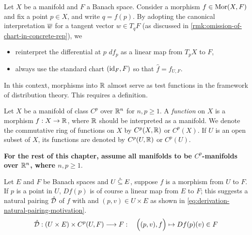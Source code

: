 \documentclass[../main-manifolds.tex]{subfiles}
\begin{document}
Let $X$ be a manifold and $F$ a Banach space. Consider a morphism $f \in \operatorname{Mor}(X,F)$ and fix a point $p \in X$, and write $q = f(p)$. By adopting the canonical interpretation $\overline{w}$ for a tangent vector $w \in T_q F$ (as discussed in \cref{rmk:omission-of-chart-in-concrete-rep}), we 

\begin{itemize}
    \item reinterpret the differential at $p$ $df_p$ as a linear map from $T_p X$ to $F$,
    \item always use the standard chart $(\operatorname{id}_{F}, F)$ so that $\hat{f} = f_{U,F}$.
\end{itemize}


In this context, morphisms into $\mathbb{R}$ almost serve as test functions in the framework of distribution theory. This requires a definition.

\begin{definition}[Function on $X$]\label{def:function-on-X}
    Let $X$ be a manifold of class $C^p$ over ${\mathbb{R}^n}$ for $n,p\geq 1$. A \emph{function} on $X$ is a morphism $f: X\to\mathbb{R}$, where $\mathbb{R}$ should be interpreted as a manifold. We denote the commutative ring of functions on $X$ by $C^p(X,\mathbb{R})$ or $C^p(X)$. If $U$ is an open subset of $X$, its functions are denoted by $C^p(U,\mathbb{R})$ or $C^p(U)$.
\end{definition}
\textbf{For the rest of this chapter, assume all manifolds to be $C^p$-manifolds over ${\mathbb{R}^n}$, where $n,p \geq 1$}. 



Let $E$ and $F$ be Banach spaces and $U\:\mathring{\subseteq}\: E$, suppose $f$ is a morphism from $U$ to $F$. If $p$ is a point in $U$, $Df(p)$ is of course a linear map from $E$ to $F$; this suggests a natural pairing $\hat{\mathcal{D}}$ of $f$ with and $(p,v)\in U\times E$ as shown in \cref{eq:derivation-natural-pairing-motivation}.
\begin{equation}\label{eq:derivation-natural-pairing-motivation}
    \hat{\mathcal{D}}: (U\times E)\times C^p(U,F)\longrightarrow F:\quad \qty\Big((p,v), f)\mapsto Df(p)(v)\in F
\end{equation}
\end{document}
